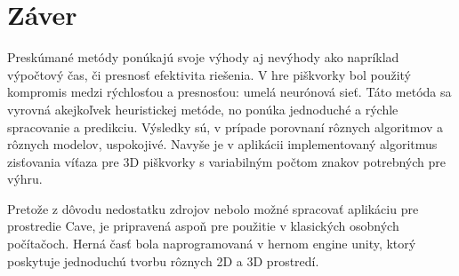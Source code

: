 \section*{Záver}

Preskúmané metódy ponúkajú svoje výhody aj nevýhody ako napríklad výpočtový čas, či presnosť efektivita riešenia.
V hre piškvorky bol použitý kompromis medzi rýchlosťou a presnosťou: umelá neurónová sieť.
Táto metóda sa vyrovná akejkoľvek heuristickej metóde, no ponúka jednoduché a rýchle spracovanie a predikciu.
Výsledky sú, v prípade porovnaní rôznych algoritmov a rôznych modelov, uspokojivé.
Navyše je v aplikácii implementovaný algoritmus zisťovania víťaza pre 3D piškvorky s variabilným počtom znakov
potrebných pre výhru.

Pretože z dôvodu nedostatku zdrojov nebolo možné spracovať aplikáciu pre prostredie Cave, je pripravená aspoň pre
použitie v klasických osobných počítačoch.
Herná časť bola naprogramovaná v hernom engine unity, ktorý poskytuje jednoduchú tvorbu rôznych 2D a 3D prostredí.

